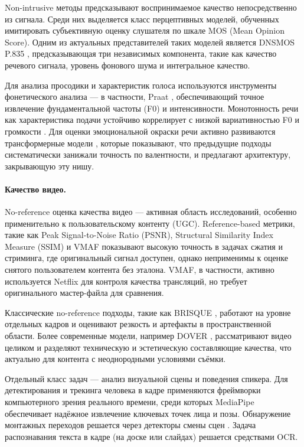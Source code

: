 Non-intrusive методы предсказывают воспринимаемое качество непосредственно из сигнала.
Среди них выделяется класс перцептивных моделей, обученных имитировать субъективную оценку слушателя по шкале MOS (Mean Opinion Score).
Одним из актуальных представителей таких моделей является DNSMOS P.835 \cite{reddy2022dnsmosp835}, предсказывающая три независимых компонента, такие как качество речевого сигнала,
уровень фонового шума и интегральное качество.

Для анализа просодики и характеристик голоса используются инструменты фонетического анализа — в частности, Praat \cite{boersma2001praat},
обеспечивающий точное извлечение фундаментальной частоты (F0) и интенсивности.
Монотонность речи как характеристика подачи устойчиво коррелирует с низкой вариативностью F0 и громкости \cite{shi2019lecturevideoquality}.
Для оценки эмоциональной окраски речи активно развиваются трансформерные модели \cite{wagner2022transformerser}, которые показывают,
что предыдущие подходы систематически занижали точность по валентности, и предлагают архитектуру, закрывающую эту нишу.

\paragraph{Качество видео.}


No-reference оценка качества видео — активная область исследований, особенно применительно к пользовательскому контенту (UGC).
Reference-based метрики, такие как Peak Signal-to-Noise Ratio (PSNR), Structural Similarity Index Measure (SSIM) \cite{wang2004ssim} и VMAF \cite{li2016vmaf} показывают высокую точность в задачах сжатия и стриминга, где оригинальный сигнал доступен,
однако неприменимы к оценке снятого пользователем контента без эталона. VMAF, в частности, активно используется Netflix для контроля качества трансляций,
но требует оригинального мастер-файла для сравнения.

Классические no-reference подходы, такие как BRISQUE \cite{mittal2012brisque}, работают на уровне отдельных кадров и оценивают резкость и артефакты в пространственной области.
Более современные модели, например DOVER \cite{wu2023vqa}, рассматривают видео целиком и разделяют техническую и эстетическую составляющие качества,
что актуально для контента с неоднородными условиями съёмки.

Отдельный класс задач — анализ визуальной сцены и поведения спикера.
Для детектирования и трекинга человека в кадре применяются фреймворки компьютерного зрения реального времени,
среди которых MediaPipe \cite{lugaresi2019mediapipe} обеспечивает надёжное извлечение ключевых точек лица и позы.
Обнаружение монтажных переходов решается через детекторы смены сцен \cite{castellano2020pyscenedetect}.
Задача распознавания текста в кадре (на доске или слайдах) решается средствами OCR.

